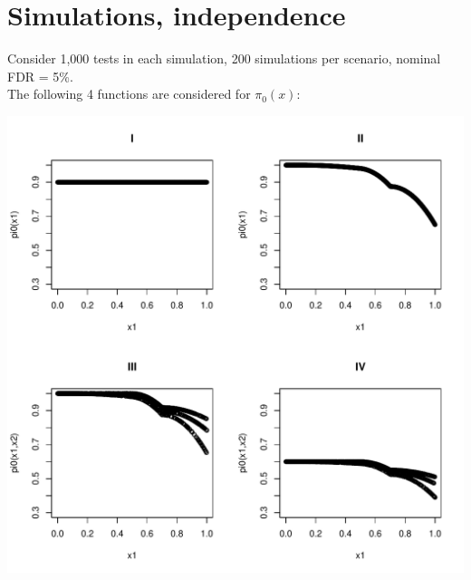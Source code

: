 \documentclass{article}\usepackage[]{graphicx}\usepackage[]{color}
\makeatletter
\def\maxwidth{ %
  \ifdim\Gin@nat@width>\linewidth
    \linewidth
  \else
    \Gin@nat@width
  \fi
}
\newenvironment{knitrout}{}{} %
\makeatother
\begin{document}
\section*{Simulations, independence}

Consider 1,000 tests in each simulation, 200 simulations per scenario, nominal FDR = 5\%.
\\
The following 4 functions are considered for $\pi_0(x)$:
\begin{knitrout}
\color{fgcolor}

{\centering \includegraphics[width=\maxwidth]{Figures/unnamed-chunk-3-1} 

}



\end{knitrout}

\clearpage
\end{document}
